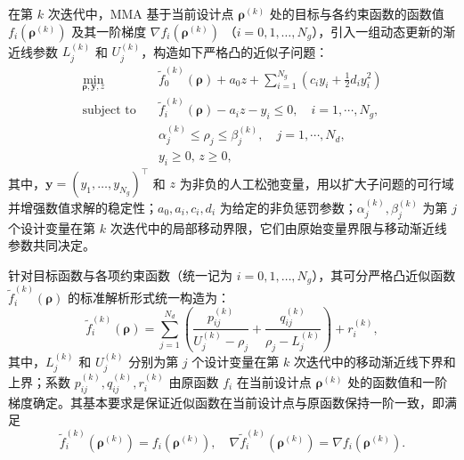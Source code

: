 在第 $k$ 次迭代中，MMA 基于当前设计点 $\boldsymbol{\rho}^{(k)}$ 处的目标与各约束函数的函数值 $f_i(\boldsymbol{\rho}^{(k)})$ 及其一阶梯度 $\nabla f_i(\boldsymbol{\rho}^{(k)})$ （$i=0,1,\dots,N_g$），引入一组动态更新的渐近线参数 $L_j^{(k)}$ 和 $U_j^{(k)}$，构造如下严格凸的近似子问题：
\begin{equation} \label{eq:ch2_mma_subproblem}
	\begin{aligned}
		\min_{\boldsymbol{\rho},\boldsymbol{y}, z}\quad&\tilde{f}_0^{(k)}(\boldsymbol{\rho}) + a_0z + \sum_{i=1}^{N_g}\left(c_iy_i+\frac{1}{2}d_iy_i^2\right)\\
		\text{subject to}\quad&\tilde{f}_i^{(k)}(\boldsymbol{\rho}) - a_iz - y_i \leq 0, \quad i=1,\cdots,N_g,\\
		&\alpha_j^{(k)}\leq\rho_j\leq\beta_j^{(k)}, \quad j=1,\cdots,N_d,\\
		&y_i\geq 0, \, z\geq 0,
	\end{aligned}
\end{equation}
其中，$\boldsymbol{y}=(y_1,\dots,y_{N_g})^\top$ 和 $z$ 为非负的人工松弛变量，用以扩大子问题的可行域并增强数值求解的稳定性；$a_0,a_i,c_i,d_i$ 为给定的非负惩罚参数；$\alpha_j^{(k)},\beta_j^{(k)}$ 为第 $j$ 个设计变量在第 $k$ 次迭代中的局部移动界限，它们由原始变量界限与移动渐近线参数共同决定。

针对目标函数与各项约束函数（统一记为 $i = 0, 1, \dots, N_g$），其可分严格凸近似函数 $\tilde{f}_i^{(k)}(\boldsymbol{\rho})$ 的标准解析形式统一构造为：
\begin{equation} \label{eq:ch2_mma_approximation}
	\tilde{f}_i^{(k)}(\boldsymbol{\rho}) = \sum_{j=1}^{N_d}\left(\frac{p_{ij}^{(k)}}{U_{j}^{(k)}-\rho_j} + \frac{q_{ij}^{(k)}}{\rho_{j}-L_j^{(k)}}\right) + r_i^{(k)},
\end{equation}
其中，$L_j^{(k)}$ 和 $U_j^{(k)}$ 分别为第 $j$ 个设计变量在第 $k$ 次迭代中的移动渐近线下界和上界；系数 $p_{ij}^{(k)}, q_{ij}^{(k)}, r_i^{(k)}$ 由原函数 $f_i$ 在当前设计点 $\boldsymbol{\rho}^{(k)}$ 处的函数值和一阶梯度确定。其基本要求是保证近似函数在当前设计点与原函数保持一阶一致，即满足
\[
\tilde{f}_i^{(k)}(\boldsymbol{\rho}^{(k)}) = f_i(\boldsymbol{\rho}^{(k)}),\quad\nabla\tilde{f}_i^{(k)}(\boldsymbol{\rho}^{(k)}) = \nabla f_i(\boldsymbol{\rho}^{(k)}).
\]

